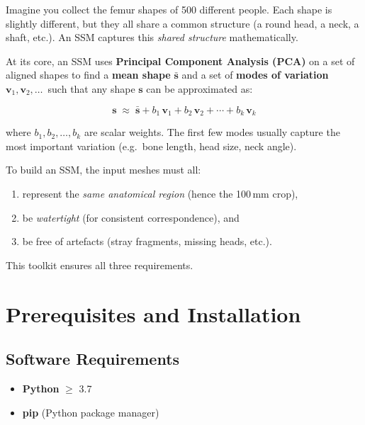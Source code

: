 \documentclass[12pt,a4paper]{article}
\begin{document}
Imagine you collect the femur shapes of 500 different people.  Each shape is
slightly different, but they all share a common structure (a round head, a neck,
a shaft, etc.).  An SSM captures this \emph{shared structure} mathematically.

At its core, an SSM uses \textbf{Principal Component Analysis (PCA)} on a set of
aligned shapes to find a \textbf{mean shape} $\bar{\mathbf{s}}$ and a set of
\textbf{modes of variation} $\mathbf{v}_1, \mathbf{v}_2, \ldots$\ such that any
shape $\mathbf{s}$ can be approximated as:

\begin{equation}
    \boxed{
        \mathbf{s} \;\approx\; \bar{\mathbf{s}}
        + b_1\,\mathbf{v}_1
        + b_2\,\mathbf{v}_2
        + \cdots
        + b_k\,\mathbf{v}_k
    }
    \label{eq:ssm}
\end{equation}

where $b_1, b_2, \ldots, b_k$ are scalar weights.  The first few modes usually
capture the most important variation (e.g.\ bone length, head size, neck angle).

To build an SSM, the input meshes must all:
\begin{enumerate}
    \item represent the \emph{same anatomical region} (hence the 100\,mm crop),
    \item be \emph{watertight} (for consistent correspondence), and
    \item be free of artefacts (stray fragments, missing heads, etc.).
\end{enumerate}

\noindent This toolkit ensures all three requirements.


\section{Prerequisites and Installation}

\subsection{Software Requirements}

\begin{itemize}
    \item \textbf{Python} $\geq$ 3.7
    \item \textbf{pip} (Python package manager)
\end{itemize}
\end{document}
